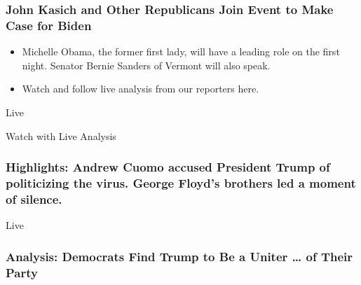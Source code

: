 \href{https://www.nytimes3xbfgragh.onion/interactive/2020/08/17/us/politics/democratic-national-convention-live-stream-analysis.html}{}

\hypertarget{john-kasich-and-other-republicans-join-event-to-make-case-for-biden}{%
\subsubsection{John Kasich and Other Republicans Join Event to Make Case
for
Biden}\label{john-kasich-and-other-republicans-join-event-to-make-case-for-biden}}

\href{https://www.nytimes3xbfgragh.onion/interactive/2020/08/17/us/politics/democratic-national-convention-live-stream-analysis.html}{}

\begin{itemize}
\tightlist
\item
  Michelle Obama, the former first lady, will have a leading role on the
  first night. Senator Bernie Sanders of Vermont will also speak.
\item
  Watch and follow live analysis from our reporters here.
\end{itemize}

\href{https://www.nytimes3xbfgragh.onion/interactive/2020/08/17/us/politics/democratic-national-convention-live-stream-analysis.html}{}

Live

Watch with Live Analysis

\href{https://www.nytimes3xbfgragh.onion/live/2020/08/17/us/dnc-convention}{}

\hypertarget{highlights-andrew-cuomo-accused-president-trump-of-politicizing-the-virus-george-floyds-brothers-led-a-moment-of-silence}{%
\subsubsection{Highlights: Andrew Cuomo accused President Trump of
politicizing the virus. George Floyd's brothers led a moment of
silence.}\label{highlights-andrew-cuomo-accused-president-trump-of-politicizing-the-virus-george-floyds-brothers-led-a-moment-of-silence}}

Live

\href{https://www.nytimes3xbfgragh.onion/2020/08/17/us/politics/convention-democratic-night-1.html}{}

\hypertarget{analysis-democrats-find-trump-to-be-a-uniter--of-their-party}{%
\subsubsection{Analysis: Democrats Find Trump to Be a Uniter \ldots{} of
Their
Party}\label{analysis-democrats-find-trump-to-be-a-uniter--of-their-party}}

